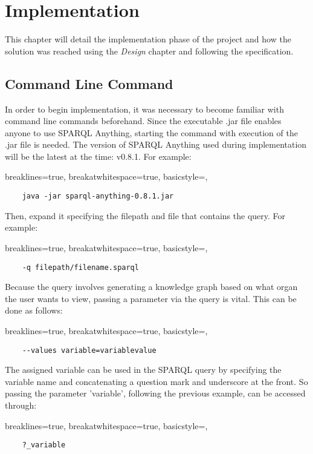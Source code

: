  \chapter{Implementation}
This chapter will detail the implementation phase of the project and how the solution was reached using the \textit{Design} chapter and following the specification. 

\section{Command Line Command}
\hspace*{0.5cm} In order to begin implementation, it was necessary to become familiar with command line commands beforehand. Since the executable .jar file enables anyone to use SPARQL Anything, starting the command with execution of the .jar file is needed. The version of SPARQL Anything used during implementation will be the latest at the time: v0.8.1. For example:

\lstset
{
    breaklines=true,
    breakatwhitespace=true,
    basicstyle=\linespread{1.5}\ttfamily,
}
\begin{lstlisting}
    java -jar sparql-anything-0.8.1.jar 
\end{lstlisting}

\noindent Then, expand it specifying the filepath and file that contains the query. For example:

\lstset
{
    breaklines=true,
    breakatwhitespace=true,
    basicstyle=\linespread{1.5}\ttfamily,
}
\begin{lstlisting}
    -q filepath/filename.sparql
\end{lstlisting}

\noindent Because the query involves generating a knowledge graph based on what organ the user wants to view, passing a parameter via the query is vital. This can be done as follows:

\lstset
{
    breaklines=true,
    breakatwhitespace=true,
    basicstyle=\linespread{1.5}\ttfamily,
}
\begin{lstlisting}
    --values variable=variablevalue
\end{lstlisting}

\noindent The assigned variable can be used in the SPARQL query by specifying the variable name and concatenating a question mark and underscore at the front. So passing the parameter 'variable', following the previous example, can be accessed through:

\lstset
{
    breaklines=true,
    breakatwhitespace=true,
    basicstyle=\linespread{1.5}\ttfamily,
}
\begin{lstlisting}
    ?_variable
\end{lstlisting}

